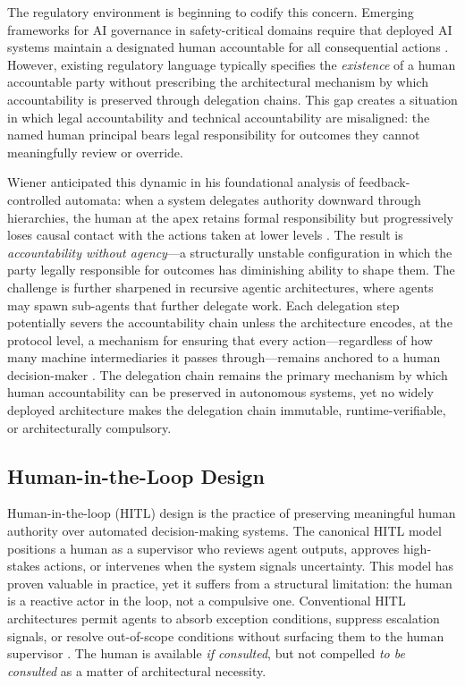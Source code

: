 The regulatory environment is beginning to codify this concern. Emerging frameworks for AI governance in safety-critical domains require that deployed AI systems maintain a designated human accountable for all consequential actions \cite{bansal2019}. However, existing regulatory language typically specifies the \emph{existence} of a human accountable party without prescribing the architectural mechanism by which accountability is preserved through delegation chains. This gap creates a situation in which legal accountability and technical accountability are misaligned: the named human principal bears legal responsibility for outcomes they cannot meaningfully review or override.

Wiener anticipated this dynamic in his foundational analysis of feedback-controlled automata: when a system delegates authority downward through hierarchies, the human at the apex retains formal responsibility but progressively loses causal contact with the actions taken at lower levels \cite{wiener1948}. The result is \emph{accountability without agency}—a structurally unstable configuration in which the party legally responsible for outcomes has diminishing ability to shape them. The challenge is further sharpened in recursive agentic architectures, where agents may spawn sub-agents that further delegate work. Each delegation step potentially severs the accountability chain unless the architecture encodes, at the protocol level, a mechanism for ensuring that every action—regardless of how many machine intermediaries it passes through—remains anchored to a human decision-maker \cite{tristr81}. The delegation chain remains the primary mechanism by which human accountability can be preserved in autonomous systems, yet no widely deployed architecture makes the delegation chain immutable, runtime-verifiable, or architecturally compulsory.

\subsection{Human-in-the-Loop Design}

Human-in-the-loop (HITL) design is the practice of preserving meaningful human authority over automated decision-making systems. The canonical HITL model positions a human as a supervisor who reviews agent outputs, approves high-stakes actions, or intervenes when the system signals uncertainty. This model has proven valuable in practice, yet it suffers from a structural limitation: the human is a reactive actor in the loop, not a compulsive one. Conventional HITL architectures permit agents to absorb exception conditions, suppress escalation signals, or resolve out-of-scope conditions without surfacing them to the human supervisor \cite{dijkstra1982}. The human is available \emph{if consulted}, but not compelled \emph{to be consulted} as a matter of architectural necessity.

